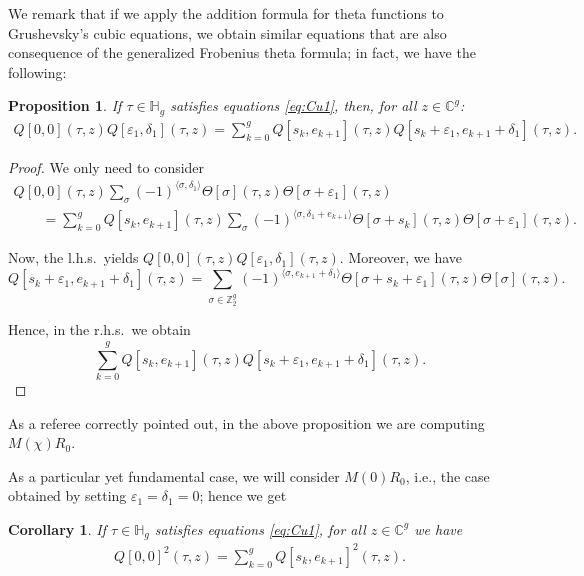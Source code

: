 \documentclass[pdftex]{sigma}
\numberwithin{equation}{section}
\newtheorem{Corollary}[Theorem]{Corollary}
\newtheorem{Proposition}[Theorem]{Proposition}
{ \theoremstyle{definition}
\newtheorem{Remark}[Theorem]{Remark} }
\newcommand{\de}{\delta}
\newcommand{\ep}{\varepsilon}
\newcommand{\CC}{{\mathbb{C}}}
\newcommand{\HH}{{\mathbb{H}}}
\newcommand{\ZZ}{{\mathbb{Z}}}
\def\ZZ{{\mathbb Z}}
\def\s{\sigma}
\def\T{\Theta}
\begin{document}
We remark that if we apply the addition formula for theta functions to Grushevsky's cubic equations, we obtain similar equations that are also consequence of the generalized Frobenius theta formula; in fact, we have the following:

\begin{Proposition}\label{statement:GF'} If $\tau\in \HH_g$ satisfies equations \eqref{eq:Cu1},
 then, for all $z\in \CC^g$:
\begin{gather}\label{eq:RF2a}
 Q[0, 0] (\tau, z)Q[\ep_1, \de_1 ] (\tau, z)=\sum_{k=0}^g Q[s_k, e_{k+1}] (\tau, z)Q[s_k+\ep_1, e_{k+1}+\de_1] (\tau, z) .
\end{gather}
\end{Proposition}

\begin{proof} We only need to consider
\begin{gather*}
Q[0,0](\tau, z)\sum_{ \s} (-1)^{\langle \s,\de_1\rangle}\T[\s](\tau,z)\T[\s+\ep_1](\tau,z)\\
\qquad{}= \sum_{k=0}^g Q[s_k, e_{k+1}](\tau, z)\sum_{ \s} (-1)^{\langle \s,\de_1+e_{k+1}\rangle}
\T[\s+s_k](\tau,z)\T[\s+\ep_1](\tau,z).
\end{gather*}

Now, the l.h.s.\ yields $ Q[0, 0](\tau, z)Q[\ep_1, \de_1 ] (\tau, z)$. Moreover, we have
\[
Q[s_k+\ep_1, e_{k+1}+\de_1](\tau, z)= \sum_{\s \in\ZZ_2^g} (-1)^{\langle\s, e_{k+1} +\de_1\rangle} \T[\s+s_k+\ep_1](\tau,z)\T[\s](\tau,z).
\]

Hence, in the r.h.s.\ we obtain
\[
\sum_{k=0}^g Q[s_k, e_{k+1}] (\tau, z)Q[s_k+\ep_1, e_{k+1}+\de_1] (\tau, z).\tag*{\qed}
\]\renewcommand{\qed}{}
\end{proof}

\begin{Remark} As a referee correctly pointed out, in the above proposition we are computing $M(\chi)R_0$. \end{Remark}

As a particular yet fundamental case, we will consider $M(0)R_0$, i.e., the case obtained by setting $\ep_1=\de_1=0$; hence we get

\begin{Corollary}\label{statement:GF} If $\tau\in \HH_g$ satisfies equations \eqref{eq:Cu1}, for all $z\in \CC^g$ we have
\begin{gather}\label{eq:RF}
 Q[0, 0]^2(\tau, z)=\sum_{k=0}^g Q[s_k, e_{k+1}]^2(\tau, z).
\end{gather}
\end{Corollary}
\end{document}
